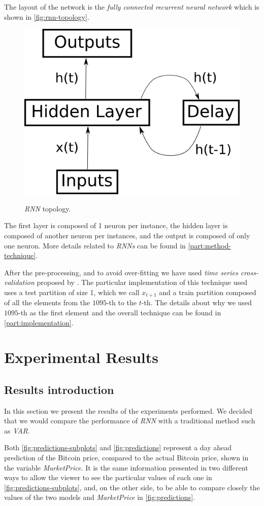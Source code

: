 The layout of the network is the \textit{fully connected recurrent
neural network} which is shown in \autoref{fig:rnn-topology}.

\begin{figure}[bth] \myfloatalign
{\includegraphics[width=.4\linewidth] {gfx/rnn-topology}}
  \caption{\textit{RNN} topology.}
  \label{fig:rnn-topology}
\end{figure}

The first layer is composed of 1 neuron per instance, the hidden layer
is composed of another neuron per instances, and the output is
composed of only one neuron. More details related to \textit{RNNs} can
be found in \autoref{part:method-technique}.

After the pre-processing, and to avoid over-fitting we have used
\textit{time series cross-validation} proposed by
\cite{robjhyndman2010}. The particular implementation of this
technique used uses a test partition of size 1, which we call $x_{t +
1}$ and a train partition composed of all the elements from the
$1095$-th to the $t$-th. The details about why we used $1095$-th as
the first element and the overall technique can be found in
\autoref{part:implementation}.

\chapter{Experimental Results}
\label{ch:experimental-results}

\section{Results introduction}
\label{sec:result-presentation}

In this section we present the results of the experiments performed.
We decided that we would compare the performance of \textit{RNN} with
a traditional method such as \textit{VAR}.

Both \autoref{fig:predictions-subplots} and \autoref{fig:predictions}
represent a day ahead prediction of the Bitcoin price, compared to the
actual Bitcoin price, shown in the variable \textit{MarketPrice}. It
is the same information presented in two different ways to allow the
viewer to see the particular values of each one in
\autoref{fig:predictions-subplots}, and, on the other side, to be able
to compare closely the values of the two models and
\textit{MarketPrice} in \autoref{fig:predictions}.

